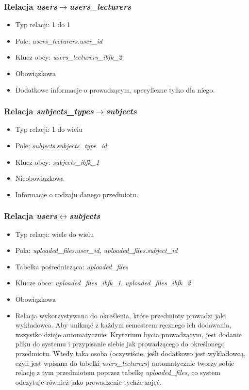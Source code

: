 \documentclass[a4paper,12pt,oneside]{report}
\begin{document}
\subsubsection{Relacja \emph{users}$\to$\emph{users\_lecturers}}
\label{subsub:users-users_lecturers}
\begin{itemize}
  \item Typ relacji: 1 do 1
  \item Pole: \emph{users\_lecturers}.\emph{user\_id}
  \item Klucz obcy: \emph{users\_lecturers\_ibfk\_2}
  \item Obowiązkowa
  \item Dodatkowe informacje o prowadzącym, specyficzne tylko dla niego.
\end{itemize}

\subsubsection{Relacja \emph{subjects\_types}$\to$\emph{subjects}}
\label{subsub:subjects_types-subjects}
\begin{itemize}
  \item Typ relacji: 1 do wielu
  \item Pole: \emph{subjects}.\emph{subjects\_type\_id}
  \item Klucz obcy: \emph{subjects\_ibfk\_1}
  \item Nieobowiązkowa
  \item Informacje o rodzaju danego przedmiotu.
\end{itemize}

\subsubsection{Relacja \emph{users}$\leftrightarrow$\emph{subjects}}
\label{subsub:users-subjects}
\begin{itemize}
  \item Typ relacji: wiele do wielu
  \item Pola: \emph{uploaded\_files}.\emph{user\_id}, \emph{uploaded\_files}.\emph{subject\_id}
  \item Tabelka pośrednicząca: \emph{uploaded\_files}
  \item Klucze obce: \emph{uploaded\_files\_ibfk\_1}, \emph{uploaded\_files\_ibfk\_2}
  \item Obowiązkowa
  \item Relacja wykorzystywana do określenia, które przedmioty prowadzi jaki wykładowca. Aby uniknąć z każdym semestrem ręcznego ich dodawania, wszystko dzieje automatycznie. Kryterium bycia prowadzącym, jest dodanie pliku do systemu i przypisanie siebie jak prowadzącego do określonego przedmiotu. Wtedy taka osoba (oczywiście, jeśli dodatkowo jest wykładowcą, czyli jest wpisana do tabelki \emph{users\_lecturers}) automatycznie tworzy sobie relację z tym przedmiotem poprzez tabelkę \emph{uploaded\_files}, co system odczytuje również jako prowadzenie tychże zajęć.
\end{itemize}
\end{document}

